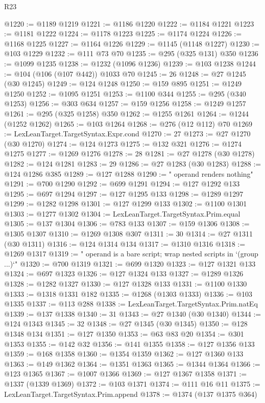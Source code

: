 \begin{lexlean}{R23}
\begin{coremodule}
@1220 := @1189 @1219
@1221 := @1186 @1220
@1222 := @1184 @1221
@1223 := @1181 @1222
@1224 := @1178 @1223
@1225 := @1174 @1224
@1226 := @1168 @1225
@1227 := @1164 @1226
@1229 := @1145 (@1148 @1227)
@1230 := @103 @1229
@1232 := @111 @73 @70
@1235 := @295 (@325 @131) @350
@1236 := @1099 @1235
@1238 := @1232 (@1096 @1236)
@1239 := @103 @1238
@1244 := @104 (@106 (@107 @442)) @1033 @70
@1245 := 26
@1248 := @27 @1245 (@30 @1245)
@1249 := @124 @1248
@1250 := @159 @895
@1251 := @1249 @1250
@1252 := @1095 @1251
@1253 := @1100 @344
@1255 := @295 (@340 @1253)
@1256 := @303 @634
@1257 := @159 @1256
@1258 := @1249 @1257
@1261 := @295 (@325 @1258) @350
@1262 := @1255 @1261
@1264 := @1244 (@1252 @1262)
@1265 := @103 @1264
@1268 := @276 (@12 @112) @70
@1269 := LexLeanTarget.TargetSyntax.Expr.cond
@1270 := 27
@1273 := @27 @1270 (@30 @1270)
@1274 := @124 @1273
@1275 := @132 @321
@1276 := @1274 @1275
@1277 := @1269 @1276
@1278 := 28
@1281 := @27 @1278 (@30 @1278)
@1282 := @124 @1281
@1283 := 29
@1286 := @27 @1283 (@30 @1283)
@1288 := @124 @1286 @385
@1289 := @127 @1288
@1290 := " operand renders nothing"
@1291 := @700 @1290
@1292 := @699 @1291
@1294 := @127 @1292 @133
@1295 := @697 @1294
@1297 := @127 @1295 @133
@1298 := @1289 @1297
@1299 := @1282 @1298
@1301 := @127 @1299 @133
@1302 := @1100 @1301
@1303 := @1277 @1302
@1304 := LexLeanTarget.TargetSyntax.Prim.equal
@1305 := @137 @1304
@1306 := @783 @133
@1307 := @159 @1306
@1308 := @1305 @1307
@1310 := @1269 @1308 @307
@1311 := 30
@1314 := @27 @1311 (@30 @1311)
@1316 := @124 @1314 @134
@1317 := @1310 @1316
@1318 := @1269 @1317
@1319 := " operand is a bare script; wrap nested scripts in `(group ...)`"
@1320 := @700 @1319
@1321 := @699 @1320
@1323 := @127 @1321 @133
@1324 := @697 @1323
@1326 := @127 @1324 @133
@1327 := @1289 @1326
@1328 := @1282 @1327
@1330 := @127 @1328 @133
@1331 := @1100 @1330
@1333 := @1318 @1331 @182
@1335 := @1268 (@1303 @1333)
@1336 := @103 @1335
@1337 := @113 @288
@1338 := LexLeanTarget.TargetSyntax.Prim.natEq
@1339 := @137 @1338
@1340 := 31
@1343 := @27 @1340 (@30 @1340)
@1344 := @124 @1343
@1345 := 32
@1348 := @27 @1345 (@30 @1345)
@1350 := @128 @1348 @134
@1351 := @127 @1350
@1353 := @63 @83 @20
@1354 := @301 @1353
@1355 := @142 @32
@1356 := @141 @1355
@1358 := @127 @1356 @133
@1359 := @168 @1358
@1360 := @1354 @1359
@1362 := @127 @1360 @133
@1363 := @149 @1362
@1364 := @1351 @1363
@1365 := @1344 @1364
@1366 := @123 @1365
@1367 := @1007 @1366
@1369 := @127 @1367 @1358
@1371 := @1337 (@1339 @1369)
@1372 := @103 @1371
@1374 := @111 @16 @11
@1375 := LexLeanTarget.TargetSyntax.Prim.append
@1378 := @1374 (@137 @1375 @364)

\end{coremodule}
\end{lexlean}
